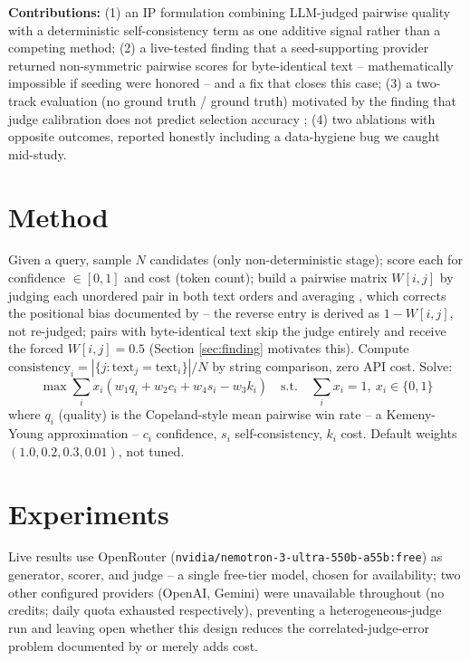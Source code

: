 \documentclass{article}
\begin{document}
\textbf{Contributions:} (1) an IP formulation combining LLM-judged
pairwise quality with a deterministic self-consistency term as one
additive signal rather than a competing method; (2) a live-tested finding
that a seed-supporting provider returned non-symmetric pairwise scores
for byte-identical text -- mathematically impossible if seeding were
honored -- and a fix that closes this case; (3) a two-track evaluation
(no ground truth / ground truth) motivated by the finding that judge
calibration does not predict selection accuracy \citep{landesberg2026bestofn};
(4) two ablations with opposite outcomes, reported honestly including a
data-hygiene bug we caught mid-study.

\section{Method}

Given a query, sample $N$ candidates (only non-deterministic stage);
score each for confidence $\in[0,1]$ and cost (token count); build a
pairwise matrix $W[i,j]$ by judging each unordered pair in both text
orders and averaging \citep{tang2024permutation}, which corrects the
positional bias documented by \citet{zheng2023judging} -- the reverse
entry is derived as $1-W[i,j]$, not re-judged; pairs with byte-identical
text skip the judge entirely and receive the forced $W[i,j]=0.5$ (Section
\ref{sec:finding} motivates this). Compute
$\text{consistency}_i = |\{j:\text{text}_j=\text{text}_i\}|/N$ by string
comparison, zero API cost. Solve:
\begin{equation}
\max \sum_i x_i \left( w_1 q_i + w_2 c_i + w_4 s_i - w_3 k_i \right)
\quad \text{s.t.} \quad \sum_i x_i = 1,\ x_i \in \{0,1\}
\end{equation}
where $q_i$ (quality) is the Copeland-style mean pairwise win rate --
a Kemeny-Young approximation \citep{llmjudgethemselves2025} -- $c_i$
confidence, $s_i$ self-consistency, $k_i$ cost. Default weights
$(1.0, 0.2, 0.3, 0.01)$, not tuned.

\section{Experiments}

Live results use OpenRouter (\texttt{nvidia/nemotron-3-ultra-550b-a55b:free})
as generator, scorer, and judge -- a single free-tier model, chosen for
availability; two other configured providers (OpenAI, Gemini) were
unavailable throughout (no credits; daily quota exhausted respectively),
preventing a heterogeneous-judge run and leaving open whether this design
reduces the correlated-judge-error problem documented by
\citet{correlatederrors2026} or merely adds cost.
\end{document}
